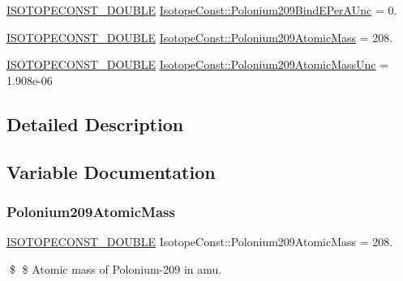 \begin{DoxyCompactItemize}
\mbox{\hyperlink{group___isotope_const-_macros_ga8f45a7272ce02c0b4c65c44636ed719a}{I\+S\+O\+T\+O\+P\+E\+C\+O\+N\+S\+T\+\_\+\+D\+O\+U\+B\+LE}} \mbox{\hyperlink{group___isotope_const-_polonium-_po209_ga017f45bfb3cdfa1aca9f41a398567c38}{Isotope\+Const\+::\+Polonium209\+Bind\+E\+Per\+A\+Unc}} = 0.
\item 
\mbox{\hyperlink{group___isotope_const-_macros_ga8f45a7272ce02c0b4c65c44636ed719a}{I\+S\+O\+T\+O\+P\+E\+C\+O\+N\+S\+T\+\_\+\+D\+O\+U\+B\+LE}} \mbox{\hyperlink{group___isotope_const-_polonium-_po209_ga1d3c5aaafe127c7b878eb12eb6c8c735}{Isotope\+Const\+::\+Polonium209\+Atomic\+Mass}} = 208.
\item 
\mbox{\hyperlink{group___isotope_const-_macros_ga8f45a7272ce02c0b4c65c44636ed719a}{I\+S\+O\+T\+O\+P\+E\+C\+O\+N\+S\+T\+\_\+\+D\+O\+U\+B\+LE}} \mbox{\hyperlink{group___isotope_const-_polonium-_po209_ga20cd9eaccb70ffd17a0b9f8e9d133f53}{Isotope\+Const\+::\+Polonium209\+Atomic\+Mass\+Unc}} = 1.\+908e-\/06
\end{DoxyCompactItemize}


\subsection{Detailed Description}


\subsection{Variable Documentation}
\mbox{\label{group___isotope_const-_polonium-_po209_ga1d3c5aaafe127c7b878eb12eb6c8c735}} 
\subsubsection{\texorpdfstring{Polonium209\+Atomic\+Mass}{Polonium209AtomicMass}}
{\footnotesize\ttfamily \mbox{\hyperlink{group___isotope_const-_macros_ga8f45a7272ce02c0b4c65c44636ed719a}{I\+S\+O\+T\+O\+P\+E\+C\+O\+N\+S\+T\+\_\+\+D\+O\+U\+B\+LE}} Isotope\+Const\+::\+Polonium209\+Atomic\+Mass = 208.}

\$ \$ Atomic mass of Polonium-\/209 in amu. \mbox{\label{group___isotope_const-_polonium-_po209_ga20cd9eaccb70ffd17a0b9f8e9d133f53}} 
